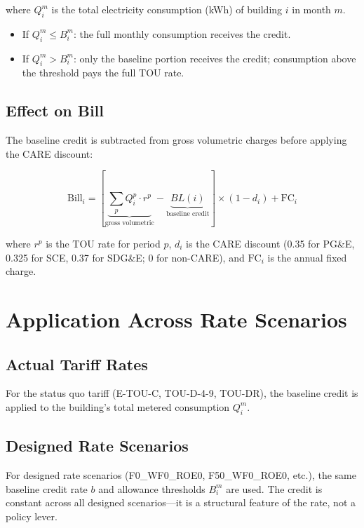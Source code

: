 \documentclass[11pt]{article}
\begin{document}
where $Q_i^m$ is the total electricity consumption (kWh) of building $i$ in month $m$.

\begin{itemize}
    \item If $Q_i^m \leq B_i^m$: the full monthly consumption receives the credit.
    \item If $Q_i^m > B_i^m$: only the baseline portion receives the credit; consumption above the threshold pays the full TOU rate.
\end{itemize}

\subsection{Effect on Bill}

The baseline credit is subtracted from gross volumetric charges before applying the CARE discount:

\begin{equation}
    \text{Bill}_i = \left[\underbrace{\sum_p Q_i^p \cdot r^p}_{\text{gross volumetric}} - \underbrace{BL(i)}_{\text{baseline credit}}\right] \times (1 - d_i) + \text{FC}_i
\end{equation}

where $r^p$ is the TOU rate for period $p$, $d_i$ is the CARE discount (0.35 for PG\&E, 0.325 for SCE, 0.37 for SDG\&E; 0 for non-CARE), and $\text{FC}_i$ is the annual fixed charge.

\section{Application Across Rate Scenarios}

\subsection{Actual Tariff Rates}

For the status quo tariff (E-TOU-C, TOU-D-4-9, TOU-DR), the baseline credit is applied to the building's total metered consumption $Q_i^m$.

\subsection{Designed Rate Scenarios}

For designed rate scenarios (F0\_WF0\_ROE0, F50\_WF0\_ROE0, etc.), the same baseline credit rate $b$ and allowance thresholds $B_i^m$ are used. The credit is constant across all designed scenarios---it is a structural feature of the rate, not a policy lever.
\end{document}
